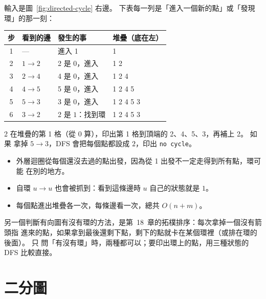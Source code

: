 
輸入是圖~\ref{fig:directed-cycle} 右邊。 下表每一列是「進入一個新的點」或「發現
環」的那一刻：

\begin{center}
\begin{tabular}{clll}
\toprule
步 & 看到的邊 & 發生的事 & 堆疊（底在左） \\
\midrule
1 & --- & 進入 1 & 1 \\
2 & $1 \to 2$ & 2 是 $0$，進入 & 1 2 \\
3 & $2 \to 4$ & 4 是 $0$，進入 & 1 2 4 \\
4 & $4 \to 5$ & 5 是 $0$，進入 & 1 2 4 5 \\
5 & $5 \to 3$ & 3 是 $0$，進入 & 1 2 4 5 3 \\
6 & $3 \to 2$ & 2 是 $1$：找到環 & 1 2 4 5 3 \\
\bottomrule
\end{tabular}
\end{center}

2 在堆疊的第 1 格（從 $0$ 算），印出第 1 格到頂端的 2、4、5、3，再補上 2。 如果
拿掉 $5 \to 3$，DFS 會把每個點都設成 $2$，印出 \texttt{no cycle}。

\begin{itemize}
\item 外層迴圈從每個還沒去過的點出發，因為從 1 出發不一定走得到所有點，環可能
在別的地方。
\item 自環 $u \to u$ 也會被抓到：看到這條邊時 $u$ 自己的狀態就是 $1$。
\item 每個點進出堆疊各一次，每條邊看一次，總共 $O(n + m)$。
\end{itemize}

另一個判斷有向圖有沒有環的方法，是第~18~章的拓樸排序：每次拿掉一個沒有箭頭指
進來的點，如果拿到最後還剩下點，剩下的點就卡在某個環裡（或排在環的後面）。 只
問「有沒有環」時，兩種都可以；要印出環上的點，用三種狀態的 DFS 比較直接。

\section{二分圖}
\label{sec:bipartite}

